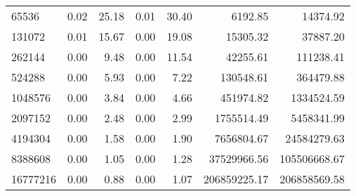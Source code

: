 \begin{tabular}{lrrrrrr}
65536    &        0.02 &         25.18 &           0.01 &        30.40 &          6192.85 &        14374.92 \\
131072   &        0.01 &         15.67 &           0.00 &        19.08 &         15305.32 &        37887.20 \\
262144   &        0.00 &          9.48 &           0.00 &        11.54 &         42255.61 &       111238.41 \\
524288   &        0.00 &          5.93 &           0.00 &         7.22 &        130548.61 &       364479.88 \\
1048576  &        0.00 &          3.84 &           0.00 &         4.66 &        451974.82 &      1334524.59 \\
2097152  &        0.00 &          2.48 &           0.00 &         2.99 &       1755514.49 &      5458341.99 \\
4194304  &        0.00 &          1.58 &           0.00 &         1.90 &       7656804.67 &     24584279.63 \\
8388608  &        0.00 &          1.05 &           0.00 &         1.28 &      37529966.56 &    105506668.67 \\
16777216 &        0.00 &          0.88 &           0.00 &         1.07 &     206859225.17 &    206858569.58 \\
\bottomrule
\end{tabular}
